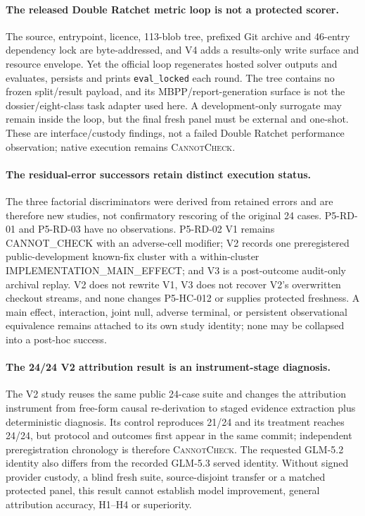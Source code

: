 \paragraph{The released Double Ratchet metric loop is not a protected scorer.}
The source, entrypoint, licence, 113-blob tree, prefixed Git archive and
46-entry dependency lock are byte-addressed, and V4 adds a results-only write
surface and resource envelope. Yet the official loop regenerates hosted solver
outputs and evaluates, persists and prints \texttt{eval\_locked} each round.
The tree contains no frozen split/result payload, and its MBPP/report-generation
surface is not the dossier/eight-class task adapter used here. A development-only
surrogate may remain inside the loop, but the final fresh panel must be external
and one-shot. These are interface/custody findings, not a failed Double Ratchet
performance observation; native execution remains \textsc{CannotCheck}.

\paragraph{The residual-error successors retain distinct execution status.}
The three factorial discriminators were derived from retained errors and are
therefore new studies, not confirmatory rescoring of the original 24 cases.
P5-RD-01 and P5-RD-03 have no observations. P5-RD-02 V1 remains
\textsf{CANNOT\_CHECK} with an adverse-cell modifier; V2 records one
preregistered public-development known-fix cluster with a within-cluster
\textsf{IMPLEMENTATION\_MAIN\_EFFECT}; and V3 is a post-outcome audit-only
archival replay. V2 does not rewrite V1, V3 does not recover V2's overwritten
checkout streams, and none changes P5-HC-012 or supplies protected freshness.
A main effect, interaction, joint null, adverse terminal, or persistent
observational equivalence remains attached to its own study identity; none may
be collapsed into a post-hoc success.

\paragraph{The 24/24 V2 attribution result is an instrument-stage diagnosis.}
The V2 study reuses the same public 24-case suite and changes the attribution
instrument from free-form causal re-derivation to staged evidence extraction
plus deterministic diagnosis. Its control reproduces 21/24 and its treatment
reaches 24/24, but protocol and outcomes first appear in the same commit;
independent preregistration chronology is therefore \textsc{CannotCheck}.
The requested GLM-5.2 identity also differs from the recorded GLM-5.3 served
identity. Without signed provider custody, a blind fresh suite, source-disjoint
transfer or a matched protected panel, this result cannot establish model
improvement, general attribution accuracy, H1--H4 or superiority.

